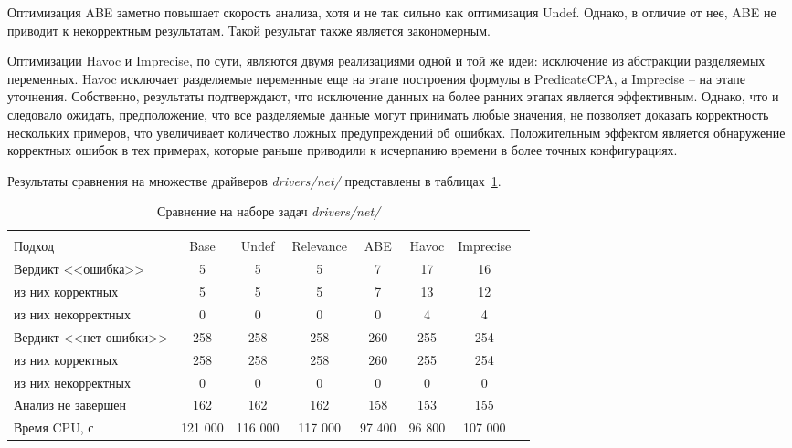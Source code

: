 Оптимизация ABE заметно повышает скорость анализа, хотя и не так сильно как оптимизация Undef. Однако, в отличие от нее, ABE не приводит к некорректным результатам. 
Такой результат также является закономерным.

Оптимизации Havoc и Imprecise, по сути, являются двумя реализациями одной и той же идеи: исключение из абстракции разделяемых переменных.
Havoc исключает разделяемые переменные еще на этапе построения формулы в PredicateCPA, а Imprecise -- на этапе уточнения.
Собственно, результаты подтверждают, что исключение данных на более ранних этапах является эффективным.
Однако, что и следовало ожидать, предположение, что все разделяемые данные могут принимать любые значения, не позволяет доказать корректность нескольких примеров, что увеличивает количество ложных предупреждений об ошибках.
Положительным эффектом является обнаружение корректных ошибок в тех примерах, которые раньше приводили к исчерпанию времени в более точных конфигурациях.

Результаты сравнения на множестве драйверов \textit{drivers/net/} представлены в таблицах~\ref{table-drivers-opt}.

  \begin{table}[h]\footnotesize \centering
    \caption{Сравнение на наборе задач \textit{drivers/net/}}
  	\label{table-drivers-opt}
    \begin{tabular}{ | l | c | c | c | c | c | c | c |}
      \hline
      		& 		\multicolumn{6}{c|}{\theoryraces}  \\
      Подход         				& Base 		& Undef		& Relevance & ABE 		& Havoc   	& Imprecise	\\ \hline
      Вердикт <<ошибка>> 			& 5  		& 5   		& 5       	& 7   		& 17     	& 16		\\ 
  \hspace{0.5cm} из них корректных 	& 5 		& 5 		& 5     	& 7   		& 13     	& 12 		\\ 
  \hspace{0.5cm} из них некорректных & 0 		& 0 		& 0     	& 0  		& 4      	& 4 		\\ \hline
      Вердикт <<нет ошибки>>  		& 258    	& 258    	& 258     	& 260   	& 255    	& 254		\\ 
  \hspace{0.5cm} из них корректных 	& 258 		& 258    	& 258       & 260   	& 255    	& 254    	\\
  \hspace{0.5cm} из них некорректных & 0 		& 0    		& 0      	& 0   		& 0     	& 0     	\\ \hline
      Анализ не завершен       		& 162    	& 162    	& 162     	& 158   	& 153    	& 155    	\\ \hline
      Время CPU, с   				& 121 000 	& 116 000 	& 117 000  	& 97 400   	& 96 800    & 107 000   \\ 
      \hline
    \end{tabular}
  \end{table}

